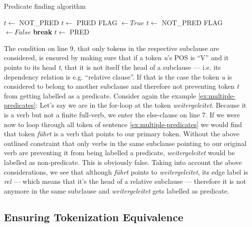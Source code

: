 \begin{algorithm}
\caption{Predicate finding algorithm}
\label{alg:find-predicates}
	\begin{algorithmic}[1]
			\STATE $t \leftarrow$ NOT\_PRED
		\ELSE
				\STATE $t \leftarrow$ PRED
			\ELSE
				\STATE FLAG $\leftarrow True$
						\STATE $t \leftarrow$ NOT\_PRED
						\STATE FLAG $\leftarrow False$
						\STATE \textbf{break}
					\ENDIF
				\ENDFOR
				\IF{FLAG $= True$}
					\STATE $t \leftarrow$ PRED
				\ENDIF
			\ENDIF
		\ENDIF
	\ENDFOR
\end{algorithmic}
\end{algorithm}

The condition on line 9, that only tokens in the respective subclause are considered, is
ensured by making sure that if a token \textit{u}'s POS is ``V'' and it points to its head
\textit{t}, that it is not itself the head of a subclause --- i.e. its dependency relation
is e.g. ``relative clause''. If that is the case the token \textit{u} is considered to
belong to another subclause and therefore not preventing token \textit{t} from getting
labelled as a predicate. Consider again the example \ref{ex:multiple-predicates}: Let's say
we are in the for-loop at the token \textit{weitergeleitet}. Because it is a verb but not
a finite full-verb, we enter the else-clause on line 7. If we were now to loop through all
token of sentence \ref{ex:multiple-predicates} we would find that token \textit{führt} is a
verb that points to our primary token. Without the above outlined constraint that only verbs
in the same subclause pointing to our original verb are preventing it from being labelled
a predicate, \textit{weitergeleitet} would be labelled as non-predicate. This is obviously
false. Taking into account the above considerations, we see that although \textit{führt}
points to \textit{weitergeleitet}, its edge label is \textit{rel} --- which means that it's
the head of a relative subclause --- therefore it is not anymore in the same subclause and
\textit{weitergeleitet} gets labelled as predicate.

\subsection{Ensuring Tokenization Equivalence}

